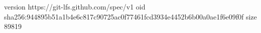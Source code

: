version https://git-lfs.github.com/spec/v1
oid sha256:944895b51a1b4e6c817c90725ac0f77461fcd3934e4452b6b00a0ae1f6e09f0f
size 89819
